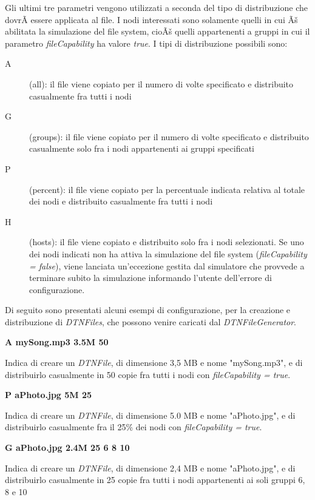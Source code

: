 Gli ultimi tre parametri vengono utilizzati a seconda del tipo di distribuzione che dovrÃ  essere applicata al file. I nodi interessati sono solamente quelli in cui Ãš abilitata la simulazione del file system, cioÃš quelli appartenenti a gruppi in cui il parametro \textit{fileCapability} ha valore \textit{true}. I tipi di distribuzione possibili sono:
\begin{description}
\item[A] (all): il file viene copiato per il numero di volte specificato e distribuito casualmente fra tutti i nodi
\item[G] (groups): il file viene copiato per il numero di volte specificato e distribuito casualmente solo fra i nodi appartenenti ai gruppi specificati
\item[P] (percent): il file viene copiato per la percentuale indicata relativa al totale dei nodi e distribuito casualmente fra tutti i nodi
\item[H] (hosts): il file viene copiato e distribuito solo fra i nodi selezionati. Se uno dei nodi indicati non ha attiva la simulazione del file system (\textit{fileCapability = false}), viene lanciata un'eccezione gestita dal simulatore che provvede a terminare subito la simulazione informando l'utente dell'errore di configurazione.
\end{description}

Di seguito sono presentati alcuni esempi di configurazione, per la creazione e distribuzione di \textit{DTNFiles}, che possono venire caricati dal \textit{DTNFileGenerator}.

\begin{center}
\textbf{A	mySong.mp3	3.5M	50}
\end{center}
Indica di creare un \textit{DTNFile}, di dimensione 3,5 MB e nome "mySong.mp3", e di distribuirlo casualmente in 50 copie fra tutti i nodi con \textit{fileCapability = true}.
\\

\begin{center}
\textbf{P	aPhoto.jpg	5M	25}
\end{center}
Indica di creare un \textit{DTNFile}, di dimensione 5.0 MB e nome "aPhoto.jpg", e di distribuirlo casualmente fra il 25\% dei nodi con \textit{fileCapability = true}.
\\

\begin{center}
\textbf{G	aPhoto.jpg	2.4M	25	6	8	10}
\end{center}
Indica di creare un \textit{DTNFile}, di dimensione 2,4 MB e nome "aPhoto.jpg", e di distribuirlo casualmente in 25 copie fra tutti i nodi appartenenti ai soli gruppi 6, 8 e 10
\\

